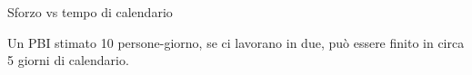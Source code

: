 \begin{boxexample}{Sforzo vs tempo di calendario}

Un PBI stimato 10 persone-giorno, se ci lavorano in due, può essere
finito in circa 5 giorni di calendario.

\end{boxexample}
